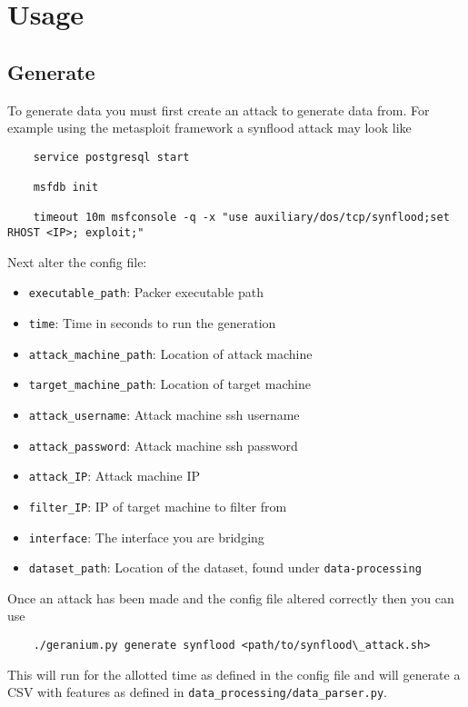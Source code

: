 \section{Usage}

\subsection{Generate}
To generate data you must first create an attack to generate data from. For example using the metasploit framework a synflood attack may look like

\begin{lstlisting}
    service postgresql start

    msfdb init

    timeout 10m msfconsole -q -x "use auxiliary/dos/tcp/synflood;set RHOST <IP>; exploit;"
\end{lstlisting}
Next alter the config file:
\begin{itemize}
    \item \texttt{executable\_path}: Packer executable path
    \item \texttt{time}: Time in seconds to run the generation
    \item \texttt{attack\_machine\_path}: Location of attack machine
    \item \texttt{target\_machine\_path}: Location of target machine
    \item \texttt{attack\_username}: Attack machine ssh username
    \item \texttt{attack\_password}: Attack machine ssh password
    \item \texttt{attack\_IP}: Attack machine IP
    \item \texttt{filter\_IP}: IP of target machine to filter from
    \item  \texttt{interface}: The interface you are bridging
    \item \texttt{dataset\_path}: Location of the dataset, found under \texttt{data-processing}
\end{itemize}

Once an attack has been made and the config file altered correctly then you can use

\begin{verbatim}
    ./geranium.py generate synflood <path/to/synflood\_attack.sh>
\end{verbatim}

This will run for the allotted time as defined in the config file and will generate a CSV with features as defined in \texttt{data\_processing/data\_parser.py}.

